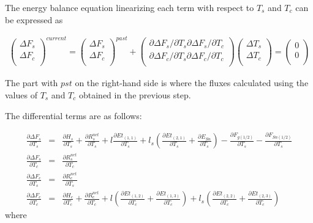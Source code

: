 The energy balance equation linearizing each term with respect to \(T_s\) and \(T_c\) can be expressed as

\begin{eqnarray}
 \left(
\begin{array}{l}
 \Delta F_s \\
 \Delta F_c \\
\end{array}
\right)^{current}
=
\left(
\begin{array}{l}
 \Delta F_s \\
 \Delta F_c \\
\end{array}
\right)^{past}
+
\left(
\begin{array}{ll}
 {\partial \Delta F_s}/{\partial T_s}
 {\partial \Delta F_s}/{\partial T_c} \\
 {\partial \Delta F_c}/{\partial T_s}
 {\partial \Delta F_c}/{\partial T_c} \\
\end{array}
\right)
\left(
\begin{array}{l}
 \Delta T_s \\
 \Delta T_c \\
\end{array}
\right)
=
\left(
\begin{array}{l}
 0 \\
 0 \\
\end{array}
\right) \label{eq140}
\end{eqnarray}

The part with \(pst\) on the right-hand side is where the fluxes calculated \hyperref[eq139]{} using the values of \(T_s\) and \(T_c\) obtained in the previous step.

The differential terms are as follows:

\begin{eqnarray}
 \frac{\partial \Delta F_s}{\partial T_s} &=&
 \frac{\partial H_s}{\partial T_s}
+\frac{\partial R^{net}_s}{\partial T_s}
+l\frac{\partial Et_{(1,1)}}{\partial T_s}
+l_s\left(\frac{\partial Et_{(2,1)}}{\partial T_s}
+    \frac{\partial E_{Sn}}{\partial T_s}\right)
-\frac{\partial F_{g(1/2)}}{\partial T_s}
-\frac{\partial F_{Sn(1/2)}}{\partial T_s} \\
 \frac{\partial \Delta F_s}{\partial T_c} &=&
 \frac{\partial R^{net}_s}{\partial T_c} \\
 \frac{\partial \Delta F_c}{\partial T_s} &=&
 \frac{\partial R^{net}_c}{\partial T_s} \\
 \frac{\partial \Delta F_c}{\partial T_c} &=&
 \frac{\partial H_c}{\partial T_c}
+\frac{\partial R^{net}_c}{\partial T_c}
+l  \left(\frac{\partial Et_{(1,2)}}{\partial T_c}
+         \frac{\partial Et_{(1,3)}}{\partial T_c}\right)
+l_s\left(\frac{\partial Et_{(2,2)}}{\partial T_c}
+         \frac{\partial Et_{(2,3)}}{\partial T_c}\right)
\end{eqnarray} where

